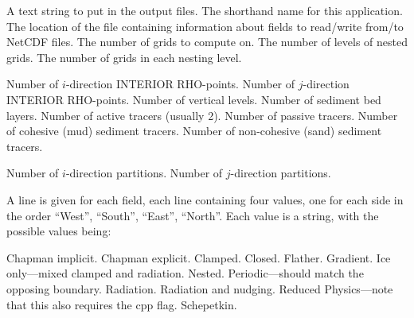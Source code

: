 \begin{klist}
    \mbox{}
     \begin{klist}
    A text string to put in the output files.
    The shorthand name for this application.
    The location of the  file
     containing information about fields to read/write from/to NetCDF
     files.
    The number of grids to compute on.
    The number of levels of nested grids.
    The number of grids in each nesting level.
     \end{klist}
    \mbox{}
     \begin{klist}
        Number of $i$-direction INTERIOR RHO-points.
        Number of $j$-direction INTERIOR RHO-points.
        Number of vertical levels.
        Number of sediment bed layers.
        Number of active tracers (usually 2).
        Number of passive tracers.
        Number of cohesive (mud) sediment tracers.
        Number of non-cohesive (sand) sediment tracers.
     \end{klist}
    \mbox{}
     \begin{klist}
        Number of $i$-direction partitions.
        Number of $j$-direction partitions.
     \end{klist}
    \mbox{}
     \begin{klist}
        A line is given for each field, each line
       containing four values, one for each side in the order
       ``West'', ``South'', ``East'', ``North''. Each value is a
       string, with the possible values being:
         \begin{klist}
              Chapman implicit.
              Chapman explicit.
              Clamped.
              Closed.
              Flather.
              Gradient.
              Ice only---mixed clamped and radiation.
              Nested.
              Periodic---should match the opposing
boundary.
              Radiation.
           Radiation and nudging.
              Reduced Physics---note that this also
requires the  cpp flag.
              Schepetkin.
         \end{klist}

\end{klist}
\end{klist}

